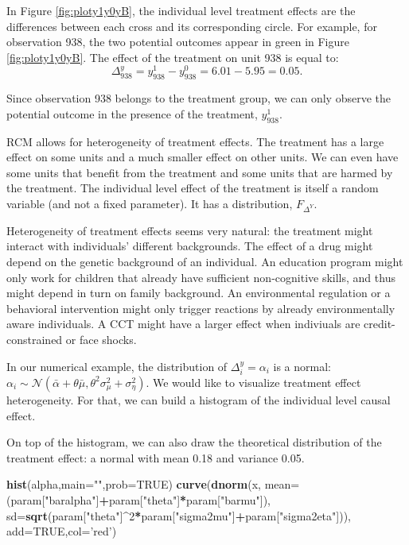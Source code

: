 \documentclass[]{book}
\newenvironment{Shaded}{\begin{snugshade}}{\end{snugshade}}
\newcommand{\DataTypeTok}[1]{\textcolor[rgb]{0.13,0.29,0.53}{#1}}
\newcommand{\DecValTok}[1]{\textcolor[rgb]{0.00,0.00,0.81}{#1}}
\newcommand{\KeywordTok}[1]{\textcolor[rgb]{0.13,0.29,0.53}{\textbf{#1}}}
\newcommand{\NormalTok}[1]{#1}
\newcommand{\OperatorTok}[1]{\textcolor[rgb]{0.81,0.36,0.00}{\textbf{#1}}}
\newcommand{\OtherTok}[1]{\textcolor[rgb]{0.56,0.35,0.01}{#1}}
\newcommand{\StringTok}[1]{\textcolor[rgb]{0.31,0.60,0.02}{#1}}
\theoremstyle{definition}
\theoremstyle{definition}
\theoremstyle{definition}
\theoremstyle{remark}
\let\BeginKnitrBlock\begin \let\EndKnitrBlock\end
\begin{document}
In Figure \ref{fig:ploty1y0yB}, the individual level treatment effects are the differences between each cross and its corresponding circle.
For example, for observation 938, the two potential outcomes appear in green in Figure \ref{fig:ploty1y0yB}.
The effect of the treatment on unit 938 is equal to:
\[
\Delta^y_{938}=y^1_{938}-y^0_{938}=6.01-5.95=0.05.
\]

Since observation 938 belongs to the treatment group, we can only observe the potential outcome in the presence of the treatment, \(y^1_{938}\).

RCM allows for heterogeneity of treatment effects.
The treatment has a large effect on some units and a much smaller effect on other units.
We can even have some units that benefit from the treatment and some units that are harmed by the treatment.
The individual level effect of the treatment is itself a random variable (and not a fixed parameter).
It has a distribution, \(F_{\Delta^Y}\).

Heterogeneity of treatment effects seems very natural: the treatment might interact with individuals' different backgrounds.
The effect of a drug might depend on the genetic background of an individual.
An education program might only work for children that already have sufficient non-cognitive skills, and thus might depend in turn on family background.
An environmental regulation or a behavioral intervention might only trigger reactions by already environmentally aware individuals.
A CCT might have a larger effect when indiviuals are credit-constrained or face shocks.

\BeginKnitrBlock{example}
\protect\hypertarget{exm:unnamed-chunk-8}{}{\label{exm:unnamed-chunk-8} }In our numerical example, the distribution of \(\Delta^y_i=\alpha_i\) is a normal: \(\alpha_i\sim\mathcal{N}(\bar{\alpha}+\theta\bar{\mu},\theta^2\sigma^2_{\mu}+\sigma^2_{\eta})\).
We would like to visualize treatment effect heterogeneity.
For that, we can build a histogram of the individual level causal effect.
\EndKnitrBlock{example}

On top of the histogram, we can also draw the theoretical distribution of the treatment effect: a normal with mean 0.18 and variance 0.05.

\begin{Shaded}
\begin{Highlighting}[]
\KeywordTok{hist}\NormalTok{(alpha,}\DataTypeTok{main=}\StringTok{""}\NormalTok{,}\DataTypeTok{prob=}\OtherTok{TRUE}\NormalTok{)}
\KeywordTok{curve}\NormalTok{(}\KeywordTok{dnorm}\NormalTok{(x, }\DataTypeTok{mean=}\NormalTok{(param[}\StringTok{"baralpha"}\NormalTok{]}\OperatorTok{+}\NormalTok{param[}\StringTok{"theta"}\NormalTok{]}\OperatorTok{*}\NormalTok{param[}\StringTok{"barmu"}\NormalTok{]), }\DataTypeTok{sd=}\KeywordTok{sqrt}\NormalTok{(param[}\StringTok{"theta"}\NormalTok{]}\OperatorTok{^}\DecValTok{2}\OperatorTok{*}\NormalTok{param[}\StringTok{"sigma2mu"}\NormalTok{]}\OperatorTok{+}\NormalTok{param[}\StringTok{"sigma2eta"}\NormalTok{])), }\DataTypeTok{add=}\OtherTok{TRUE}\NormalTok{,}\DataTypeTok{col=}\StringTok{'red'}\NormalTok{)}
\end{Highlighting}
\end{Shaded}
\end{document}
